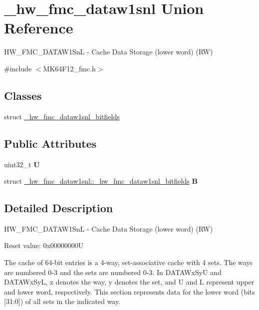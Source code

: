 \hypertarget{union__hw__fmc__dataw1snl}{}\section{\+\_\+hw\+\_\+fmc\+\_\+dataw1snl Union Reference}
\label{union__hw__fmc__dataw1snl}


H\+W\+\_\+\+F\+M\+C\+\_\+\+D\+A\+T\+A\+W1\+SnL -\/ Cache Data Storage (lower word) (RW)  




{\ttfamily \#include $<$M\+K64\+F12\+\_\+fmc.\+h$>$}

\subsection*{Classes}
\begin{DoxyCompactItemize}
\item 
struct \hyperlink{struct__hw__fmc__dataw1snl_1_1__hw__fmc__dataw1snl__bitfields}{\+\_\+hw\+\_\+fmc\+\_\+dataw1snl\+\_\+bitfields}
\end{DoxyCompactItemize}
\subsection*{Public Attributes}
\begin{DoxyCompactItemize}
\item 
uint32\+\_\+t {\bfseries U}\hypertarget{union__hw__fmc__dataw1snl_a9b7e6421ff86386c43e3e26f392465f4}{}\label{union__hw__fmc__dataw1snl_a9b7e6421ff86386c43e3e26f392465f4}

\item 
struct \hyperlink{struct__hw__fmc__dataw1snl_1_1__hw__fmc__dataw1snl__bitfields}{\+\_\+hw\+\_\+fmc\+\_\+dataw1snl\+::\+\_\+hw\+\_\+fmc\+\_\+dataw1snl\+\_\+bitfields} {\bfseries B}\hypertarget{union__hw__fmc__dataw1snl_ada80e47aae13e803992c190fa4253693}{}\label{union__hw__fmc__dataw1snl_ada80e47aae13e803992c190fa4253693}

\end{DoxyCompactItemize}


\subsection{Detailed Description}
H\+W\+\_\+\+F\+M\+C\+\_\+\+D\+A\+T\+A\+W1\+SnL -\/ Cache Data Storage (lower word) (RW) 

Reset value\+: 0x00000000U

The cache of 64-\/bit entries is a 4-\/way, set-\/associative cache with 4 sets. The ways are numbered 0-\/3 and the sets are numbered 0-\/3. In D\+A\+T\+A\+Wx\+SyU and D\+A\+T\+A\+Wx\+SyL, x denotes the way, y denotes the set, and U and L represent upper and lower word, respectively. This section represents data for the lower word (bits \mbox{[}31\+:0\mbox{]}) of all sets in the indicated way. 

